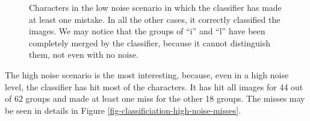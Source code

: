 \begin{figure}[!htb]
  \caption{Characters in the low noise scenario in which the classifier has made at least one mistake. In all the other cases, it correctly classified the images. We may notice that the groups of ``i'' and ``l'' have been completely merged by the classifier, because it cannot distinguish them, not even with no noise.}
  \label{fig-classification-low-noise-results}
\end{figure}

The high noise scenario is the most interesting, because, even in a high noise level, the classifier has hit most of the characters. It has hit all images for 44 out of 62 groups and made at least one miss for the other 18 groups. The misses may be seen in details in Figure \ref{fig-classificiation-high-noise-misses}.

\begin{figure}[!htb]
  \centering





\end{figure}
